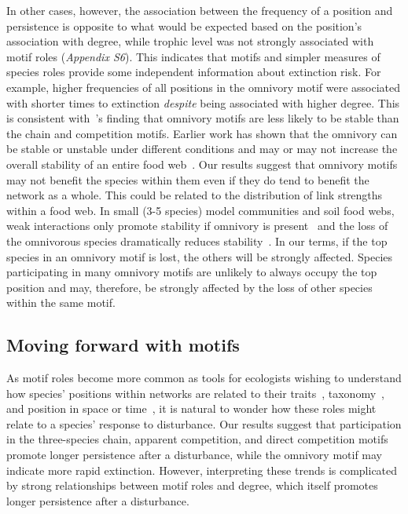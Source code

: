 \documentclass[12pt]{article}
\begin{document}
\begin{spacing}{2.0}
        
        In other cases, however, the association between the frequency of a position and persistence is opposite to what would be expected based on the position's association with degree, while trophic level was not strongly associated with motif roles (\emph{Appendix S6}).
        This indicates that motifs and simpler measures of species roles provide some independent information about extinction risk.
        For example, higher frequencies of all positions in the omnivory motif were associated with shorter times to extinction \emph{despite} being associated with higher degree.
        This is consistent with~\citet{Borrelli2015a}'s finding that omnivory motifs are less likely to be stable than the chain and competition motifs.
        Earlier work has shown that the omnivory can be stable or unstable under different conditions and may or may not increase the overall stability of an entire food web~\citep{McCann1997,Emmerson2004,Borrelli2015a,Monteiro2016}.
        Our results suggest that omnivory motifs may not benefit the species within them even if they do tend to benefit the network as a whole.
        This could be related to the distribution of link strengths within a food web.
        In small (3-5 species) model communities and soil food webs, weak interactions only promote stability if omnivory is present~\citep{Neutel2002,Emmerson2004} and the loss of the omnivorous species dramatically reduces stability~\citep{Emmerson2004}.
        In our terms, if the top species in an omnivory motif is lost, the others will be strongly affected.
        Species participating in many omnivory motifs are unlikely to always occupy the top position and may, therefore, be strongly affected by the loss of other species within the same motif.
        

	\subsection*{Moving forward with motifs}	

        As motif roles become more common as tools for ecologists wishing to understand how species' positions within networks are related to their traits~\citep{Cirtwill2018EcolLett}, taxonomy~\citep{Stouffer2007}, and position in space or time~\citep{Baker2015}, it is natural to wonder how these roles might relate to a species' response to disturbance. 
        Our results suggest that participation in the three-species chain, apparent competition, and direct competition motifs promote longer persistence after a disturbance, while the omnivory motif may indicate more rapid extinction.
        However, interpreting these trends is complicated by strong relationships between motif roles and degree, which itself promotes longer persistence after a disturbance.
        

\end{spacing}
\end{document}
